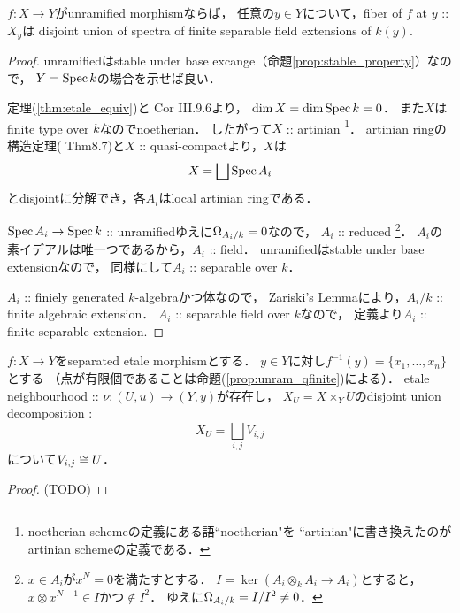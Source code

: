 \documentclass[a4paper]{jsarticle}
\begin{document}
\begin{Prop} \label{prop:unram_qfinite}
    $f \colon X \to Y$がunramified morphismならば，
    任意の$y \in Y$について，fiber of $f$ at $y$ :: $X_y$は
    disjoint union of spectra of finite separable field extensions of $k(y)$.
\end{Prop}
\begin{proof}
    unramifiedはstable under base excange（命題\ref{prop:stable_property}）なので，
    $Y=\operatorname{Spec} k$の場合を示せば良い．

    定理(\ref{thm:etale_equiv})と\cite{HarAG} Cor III.9.6より，
    $\dim X=\dim \operatorname{Spec} k=0$．
    また$X$はfinite type over $k$なのでnoetherian．
    したがって$X$ :: artinian
    \footnote{ noetherian schemeの定義にある語``noetherian"を
                ``artinian"に書き換えたのがartinian schemeの定義である． }．
    artinian ringの構造定理(\cite{Ati-Mac} Thm8.7)と$X$ :: quasi-compactより，$X$は
    \[ X=\bigsqcup \operatorname{Spec} A_i \]
    とdisjointに分解でき，各$A_i$はlocal artinian ringである．

    $\operatorname{Spec} A_i \to \operatorname{Spec} k$ :: unramifiedゆえに$\Omega_{A_i/k}=0$なので，
    $A_i$ :: reduced
    \footnote
    {
        $x \in A_i$が$x^{N}=0$を満たすとする．
        $I=\ker(A_i \otimes_k A_i \to A_i)$とすると，
        $x \otimes x^{N-1} \in I$かつ$\not \in I^2$．
        ゆえに$\Omega_{A_i/k}=I/I^2 \neq 0$．
    }．
    $A_i$の素イデアルは唯一つであるから，$A_i$ :: field．
    unramifiedはstable under base extensionなので，
    同様にして$A_i$ :: separable over $k$．

    $A_i$ :: finiely generated $k$-algebraかつ体なので，
    Zariski's Lemmaにより，$A_i/k$ :: finite algebraic extension．
    $A_i$ :: separable field over $k$なので，
    定義より$A_i$ :: finite separable extension.
\end{proof}

\begin{Prop}
    $f \colon X \to Y$をseparated etale morphismとする．
    $y \in Y$に対し$f^{-1}(y)=\{x_1,\dots,x_n \}$とする
    （点が有限個であることは命題(\ref{prop:unram_qfinite})による）．
    etale neighbourhood :: $\nu: (U, u) \to (Y, y)$が存在し，
    $X_U=X \times_{Y} U$のdisjoint union decomposition :
    \[ X_U=\bigsqcup_{i, j} V_{i, j} \]
    について$V_{i, j} \cong U$．
\end{Prop}
\begin{proof}
    (TODO)
\end{proof}
\end{document}
